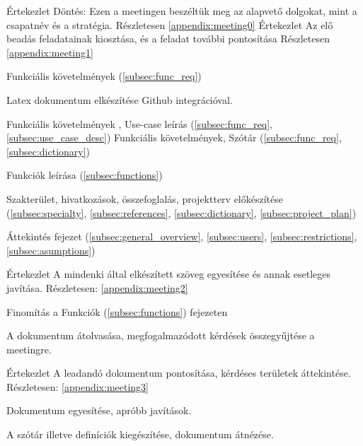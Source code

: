 \documentclass[../../projlab]{subfiles}
\begin{document}
\begin{naplo}
	{ Értekezlet
		\newline Döntés: Ezen a meetingen beszéltük meg az alapvető dolgokat, mint a csapatnév és a stratégia.
		Részletesen \ref{appendix:meeting0}
	}
	{ Értekezlet
		\newline Az elő beadás feladatainak kiosztása, és a feladat további pontosítása
		Részletesen \ref{appendix:meeting1}
	}
	

	{ 
		Funkciális követelmények (\ref{subsec:func_req})
	}
	
	{ 
		Latex dokumentum elkészítése Github integrációval.
	}
	
	{ 
		Funkciális követelmények , Use-case leírás (\ref{subsec:func_req}, \ref{subsec:use_case_desc})
	}
	{ 
		Funkciális követelmények, Szótár (\ref{subsec:func_req}, \ref{subsec:dictionary})
	}



	{ 
		Funkciók leírása (\ref{subsec:functions})
	}

	{ 
		Szakterület, hivatkozások, összefoglalás, projektterv előkészítése (\ref{subsec:specialty}, \ref{subsec:references}, \ref{subsec:dictionary}, \ref{subsec:project_plan})
	}

	{ 
		Áttekintés fejezet  (\ref{subsec:general_overview}, \ref{subsec:users}, \ref{subsec:restrictions}, \ref{subsec:asumptions})
	}

	{ 
		Értekezlet
		\newline A mindenki által elkészített szöveg egyesítése és annak esetleges javítása.
		\newline
		Részletesen: \ref{appendix:meeting2}
	}
	
	{ 
		Finomítás a Funkciók (\ref{subsec:functions}) fejezeten
	}
	
	{ 
		A dokumentum átolvasása, megfogalmazódott kérdések összegyűjtése a meetingre.
	}

	{ 
		Értekezlet \newline 
		A leadandó dokumentum pontosítása, kérdéses területek áttekintése.
		\newline
		Részletesen: \ref{appendix:meeting3}
	}
	
	
	{ 
		Dokumentum egyesítése, apróbb javítások.
	}
	
	{ 
		A szótár illetve definíciók kiegészítése, dokumentum átnézése. 
	}

	

\end{naplo}
\end{document}
